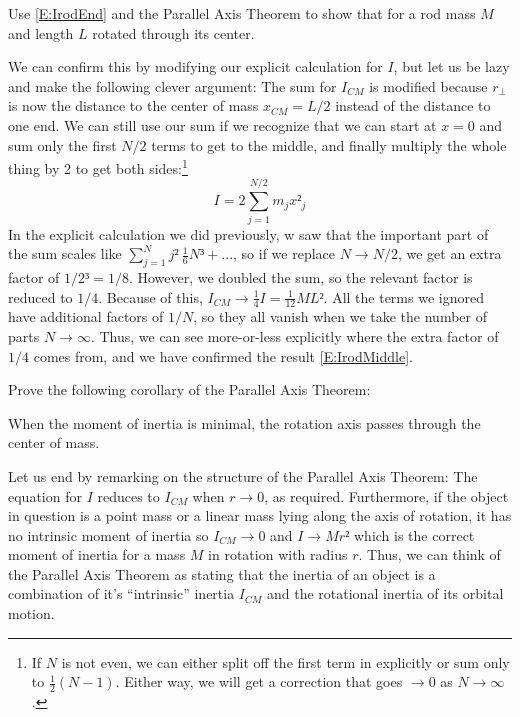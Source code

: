 \begin{exercise}
Use \eqref{E:IrodEnd} and the Parallel Axis Theorem to show that 
for a rod mass $M$ and length $L$ rotated through its center.
\end{exercise}

We can confirm this by modifying our explicit calculation for $I$, but let us be lazy and make the following clever argument: The sum for $I_{CM}$ is modified because $r_⟂$ is now the distance to the center of mass $x_{CM}=L/2$ instead of the distance to one end. We can still use our sum if we recognize that we can start at $x=0$ and sum only the first $N/2$ terms to get to the middle, and finally multiply the whole thing by 2 to get both sides:\footnote{If $N$ is not even, we can either split off the first term in explicitly or sum only to $\tfrac12(N-1)$. Either way, we will get a correction that goes $→ 0$ as $N→ ∞$. }
$$
I = 2 \sum_{j=1}^{N/2} m_j x²_j
$$
In the explicit calculation we did previously, w saw that the important part of the sum scales like $\sum_{j=1}^N j² ~ \frac16 N³ + ...$, so if we replace $N→ N/2$, we get an extra factor of $1/2³ = 1/8$. However, we doubled the sum, so the relevant factor is reduced to $1/4$. Because of this, $I_{CM} → \frac14  I = \frac1{12} ML²$. 
All the terms we ignored have additional factors of $1/N$, so they all vanish when we take the number of parts $N→ ∞ $. Thus, we can see more-or-less explicitly where the extra factor of $1/4$ comes from, and we have confirmed the result \eqref{E:IrodMiddle}.

\begin{exercise}
Prove the following corollary of the Parallel Axis Theorem:
\begin{corollary}
When the moment of inertia is minimal, the rotation axis passes through the center of mass. 
\end{corollary}
\end{exercise}

Let us end by remarking on the structure of the Parallel Axis Theorem: The equation for $I$ reduces to $I_{CM}$ when $r→ 0$, as required. Furthermore, if the object in question is a point mass or a linear mass lying along the axis of rotation, it has no intrinsic moment of inertia so $I_{CM}→ 0$ and $I→ Mr²$ which is the correct moment of inertia for a mass $M$ in rotation with radius $r$. Thus, we can think of the Parallel Axis Theorem as stating that the inertia of an object is a combination of it's “intrinsic” inertia $I_{CM}$ and the rotational inertia of its orbital motion.

